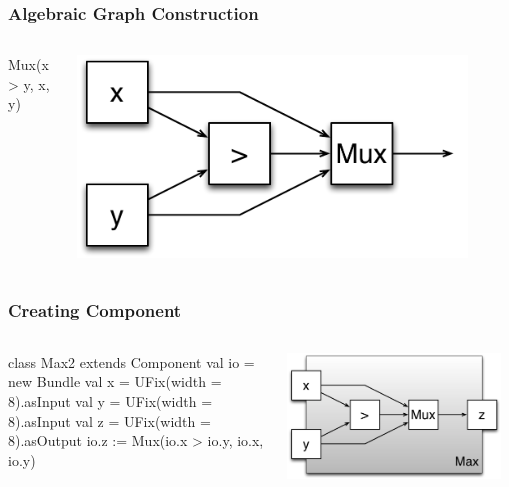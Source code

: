 \documentclass[xcolor=pdflatex,dvipsnames,table]{beamer}
\begin{document}
\begin{frame}[fragile]
\frametitle{Algebraic Graph Construction}

\begin{columns}
{
\begin{scala}
Mux(x > y, x, y)
\end{scala}
}


\begin{center}
\includegraphics[width=0.9\textwidth]{figs/max2.pdf} 
\end{center}
\end{columns}
\end{frame}

\begin{frame}[fragile]
\frametitle{Creating Component}

\begin{columns}

{
\begin{scala}
class Max2 extends Component {
  val io = new Bundle {
    val x = UFix(width = 8).asInput
    val y = UFix(width = 8).asInput
    val z = UFix(width = 8).asOutput }
  io.z := Mux(io.x > io.y, io.x, io.y)
}
\end{scala}
}

\begin{center}
\includegraphics[width=0.95\textwidth]{figs/Max2c.pdf} \\
\end{center}
\end{columns}

\end{frame}
\end{document}
